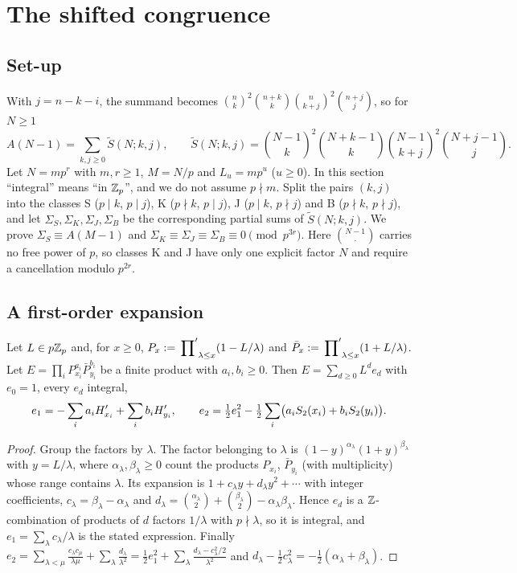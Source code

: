 \documentclass[11pt]{amsart}
\begin{document}
\section{The shifted congruence}\label{sec:shifted}

\subsection{Set-up}
With $j=n-k-i$, the summand becomes $\binom nk^2\binom{n+k}k\binom n{k+j}^2\binom{n+j}j$, so for $N\ge1$
\[ A(N-1)=\sum_{k,j\ge0}\tilde S(N;k,j),\qquad \tilde S(N;k,j)=\binom{N-1}k^2\binom{N+k-1}k\binom{N-1}{k+j}^2\binom{N+j-1}j. \]
Let $N=mp^r$ with $m,r\ge1$, $M=N/p$ and $L_u=mp^u$ ($u\ge0$). In this section ``integral'' means ``in $\mathbb{Z}_{p}$'', and we do not assume $p\nmid m$. Split the pairs $(k,j)$ into the classes S ($p\mid k$, $p\mid j$), K ($p\nmid k$, $p\mid j$), J ($p\mid k$, $p\nmid j$) and B ($p\nmid k$, $p\nmid j$), and let $\Sigma_S,\Sigma_K,\Sigma_J,\Sigma_B$ be the corresponding partial sums of $\tilde S(N;k,j)$. We prove $\Sigma_S\equiv A(M-1)$ and $\Sigma_K\equiv\Sigma_J\equiv\Sigma_B\equiv0\pmod{p^{3r}}$. Here $\binom{N-1}{\cdot}$ carries no free power of $p$, so classes K and J have only one explicit factor $N$ and require a cancellation modulo $p^{2r}$.

\subsection{A first-order expansion}

\begin{lemma}\label{lem:firstorder}
Let $L\in p\mathbb{Z}_{p}$ and, for $x\ge0$, $P_x:=\sideset{}{'}\prod_{\lambda\le x}(1-L/\lambda)$ and $\bar P_x:=\sideset{}{'}\prod_{\lambda\le x}(1+L/\lambda)$. Let $E=\prod_iP_{x_i}^{a_i}\bar P_{y_i}^{b_i}$ be a finite product with $a_i,b_i\ge0$. Then $E=\sum_{d\ge0}L^de_d$ with $e_0=1$, every $e_d$ integral,
\[ e_1=-\sum_ia_iH'_{x_i}+\sum_ib_iH'_{y_i},\qquad e_2=\tfrac12e_1^2-\tfrac12\sum_i\bigl(a_iS_2(x_i)+b_iS_2(y_i)\bigr). \]
\end{lemma}
\begin{proof}
Group the factors by $\lambda$. The factor belonging to $\lambda$ is $(1-y)^{\alpha_\lambda}(1+y)^{\beta_\lambda}$ with $y=L/\lambda$, where $\alpha_\lambda,\beta_\lambda\ge0$ count the products $P_{x_i}$, $\bar P_{y_i}$ (with multiplicity) whose range contains $\lambda$. Its expansion is $1+c_\lambda y+d_\lambda y^2+\cdots$ with integer coefficients, $c_\lambda=\beta_\lambda-\alpha_\lambda$ and $d_\lambda=\binom{\alpha_\lambda}2+\binom{\beta_\lambda}2-\alpha_\lambda\beta_\lambda$. Hence $e_d$ is a $\mathbb{Z}$-combination of products of $d$ factors $1/\lambda$ with $p\nmid\lambda$, so it is integral, and $e_1=\sum_\lambda c_\lambda/\lambda$ is the stated expression. Finally $e_2=\sum_{\lambda<\mu}\frac{c_\lambda c_\mu}{\lambda\mu}+\sum_\lambda\frac{d_\lambda}{\lambda^2}=\frac12e_1^2+\sum_\lambda\frac{d_\lambda-c_\lambda^2/2}{\lambda^2}$ and $d_\lambda-\frac12c_\lambda^2=-\frac12(\alpha_\lambda+\beta_\lambda)$.
\end{proof}
\end{document}
